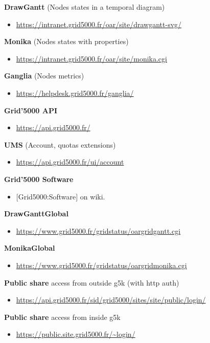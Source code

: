 \textbf{DrawGantt} (Nodes states in a temporal diagram)
\begin{itemize}
\item \url{https://intranet.grid5000.fr/oar/site/drawgantt-svg/}
\end{itemize}

\textbf{Monika} (Nodes states with properties)
\begin{itemize}
\item \url{https://intranet.grid5000.fr/oar/site/monika.cgi}
\end{itemize}

\textbf{Ganglia} (Nodes metrics)
\begin{itemize}
\item \url{https://helpdesk.grid5000.fr/ganglia/}
\end{itemize}

\textbf{Grid'5000 API}
\begin{itemize}
\item \url{https://api.grid5000.fr/}
\end{itemize}

\textbf{UMS} (Account, quotas extensions)
\begin{itemize}
\item \url{https://api.grid5000.fr/ui/account}
\end{itemize}

\textbf{Grid'5000 Software}
\begin{itemize}
\item $[$Grid5000:Software$]$ on wiki.
\end{itemize}

\textbf{DrawGanttGlobal}
\begin{itemize}
\item \url{https://www.grid5000.fr/gridstatus/oargridgantt.cgi}
\end{itemize}

\textbf{MonikaGlobal}
\begin{itemize}
\item \url{https://www.grid5000.fr/gridstatus/oargridmonika.cgi}
\end{itemize}

\textbf{Public share} access from outside g5k (with http auth)
\begin{itemize}
\item \url{https://api.grid5000.fr/sid/grid5000/sites/site/public/login/}
\end{itemize}

\textbf{Public share} access from inside g5k
\begin{itemize}
\item \url{https://public.site.grid5000.fr/~login/}
\end{itemize}

